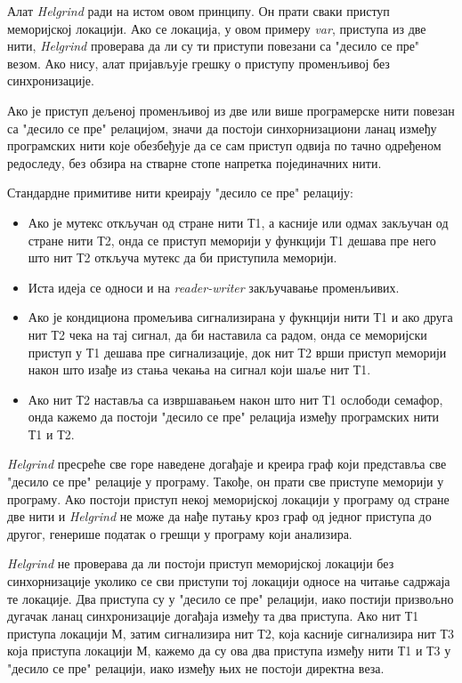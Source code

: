 \documentclass[12pt,oneside]{memoir}
\begin{document}
\indent Алат \textit{Helgrind} ради на истом овом принципу. Он прати сваки приступ меморијској локацији. Ако се локација, у овом примеру \textit{var}, приступа из две нити, \textit{Helgrind} проверава да ли су ти приступи повезани са "десило се пре" везом. Ако нису, алат пријављује грешку о приступу променљивој без синхронизације.

\indent Ако је приступ дељеној променљивој из две или више програмерске нити повезан са "десило се пре" релацијом, значи да постоји синхорнизациони ланац између програмских нити које обезбеђује да се сам приступ одвија по тачно одређеном редоследу, без обзира на стварне стопе напретка појединачних нити.

\indent Стандардне примитиве нити креирају "десило се пре" релацију:
\begin{itemize}
  \item Ако је мутекс откључан од стране нити Т1, а касније или одмах закључан од стране нити Т2, онда се приступ меморији у функцији Т1 дешава пре него што нит Т2 откључа мутекс да би приступила меморији.
  \item Иста идеја се односи и на \textit{reader-writer} закључавање променљивих.
  \item Ако је кондициона промељива сигнализирана у фукнцији нити Т1 и ако друга нит Т2 чека на тај сигнал, да би наставила са радом, онда се меморијски приступ у Т1 дешава пре сигнализације, док нит Т2 врши приступ меморији након што изађе из стања чекања на сигнал који шаље нит Т1.
  \item Ако нит Т2 наставља са извршавањем након што нит Т1 ослободи семафор, онда кажемо да постоји "десило се пре" релација између програмских нити Т1 и Т2.
\end{itemize}

\indent \textit{Helgrind} пресреће све горе наведене догађаје и креира граф који представља све "десило се пре" релације у програму. Такође, он прати све приступе меморији у програму. Ако постоји приступ некој меморијској локацији у програму од стране две нити и \textit{Helgrind} не може да нађе путању кроз граф од једног приступа до другог, генерише податак о грешци у програму који анализира.

\indent \textit{Helgrind} не проверава да ли постоји приступ меморијској локацији без синхорнизације уколико се сви приступи тој локацији односе на читање садржаја те локације. Два приступа су у "десило се пре" релацији, иако постији призвољно дугачак ланац синхронизације догађаја између та два приступа. Ако нит Т1 приступа локацији М, затим сигнализира нит Т2, која касније сигнализира нит Т3 која приступа локацији М, кажемо да су ова два приступа између нити Т1 и Т3 у "десило се пре" релацији, иако између њих не постоји директна веза.
\end{document}

